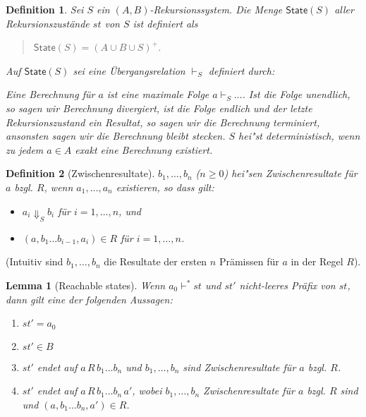 \documentclass[12pt,a2paper,draft]{article}
\newtheorem{lemma}{Lemma}
\newtheorem{definition}{Definition}
\begin{document}
\begin{definition}
  Sei $S$ ein $(A,B)$-Rekursionssystem. Die Menge $\textsf{State}(S)$ aller
  \emph{Rekursionszust\"ande} $st$ von $S$ ist definiert als
  \begin{quote}
    $\textsf{State}(S) = (A \cup B \cup S)^+$.
  \end{quote}
  Auf $\textsf{State}(S)$ sei eine \"Ubergangsrelation $\vdash_S$ definiert durch:
  Eine \emph{Berechnung f\"ur $a$} ist eine maximale Folge $a \vdash_S \ldots$. Ist die Folge unendlich,
  so sagen wir Berechnung \emph{divergiert}, ist die Folge endlich und der letzte Rekursionszustand ein
  Resultat, so sagen wir die Berechnung \emph{terminiert}, ansonsten sagen wir die Berechnung \emph{bleibt
  stecken}. $S$ hei"st \emph{deterministisch}, wenn zu jedem $a \in A$ exakt eine Berechnung existiert.
\end{definition}

\begin{definition}[Zwischenresultate]
  $b_1,\ldots,b_n$ ($n \ge 0$) hei"sen \emph{Zwischenresultate f\"ur $a$ bzgl. $R$}, wenn
  $a_1,\ldots,a_n$ existieren, so dass gilt:
  \begin{itemize}
  \item $a_i \Downarrow_S b_i$ f\"ur $i=1,\ldots,n$, und
  \item $(a,b_1 \ldots b_{i-1}, a_i) \in R$ f\"ur $i = 1,\ldots,n$.
  \end{itemize}
\end{definition}

\noindent
(Intuitiv sind $b_1,\ldots,b_n$ die Resultate der ersten $n$ Pr\"amissen f\"ur $a$ in der
Regel $R$).

\begin{lemma}[Reachable states] \label{lemma:Reachable_states}
  Wenn $a_0 \vdash^* st$ und $st'$ nicht-leeres Pr\"afix von $st$, dann gilt eine
  der folgenden Aussagen:
  \begin{enumerate}
  \item[(1)] $st' = a_0$
  \item[(2)] $st' \in B$
  \item[(3)] $st'$ endet auf $a\,R\,b_1 \ldots b_n$ und $b_1,\ldots,b_n$ sind Zwischenresultate
    f\"ur $a$ bzgl. $R$.
  \item[(4)] $st'$ endet auf $a\,R\,b_1 \ldots b_n\,a'$, wobei $b_1,\ldots,b_n$ Zwischenresultate
    f\"ur $a$ bzgl. $R$ sind und $(a,b_1 \ldots b_n,a') \in R$.
  \end{enumerate}
\end{lemma}
\end{document}
